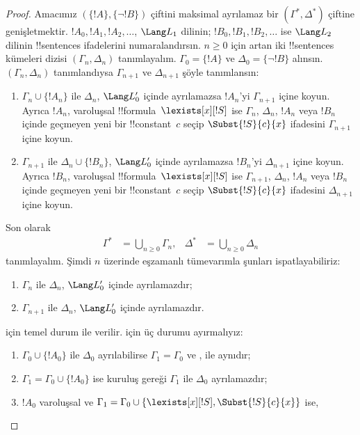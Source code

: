 \begin{proof}
Amacımız $(\{!A\},\{\lnot !B\})$ çiftini maksimal ayrılamaz bir
$(\Gamma^*,\Delta^*)$ çiftine genişletmektir. $!A_0,!A_1,!A_2,\dots$,
$\Lang L_1$ dilinin; $!B_0,!B_1,!B_2,\dots$ ise $\Lang L_2$ dilinin
!!{sentence}s ifadelerini numaralandırsın. $n\geq0$ için artan iki
!!{sentence}s kümeleri dizisi $(\Gamma_n,\Delta_n)$ tanımlayalım.
$\Gamma_0=\{!A\}$ ve $\Delta_0=\{\lnot !B\}$ alınsın.
$(\Gamma_n,\Delta_n)$ tanımlandıysa $\Gamma_{n+1}$ ve
$\Delta_{n+1}$ şöyle tanımlansın:
\begin{enumerate}
\item $\Gamma_n\cup\{!A_n\}$ ile $\Delta_n$, $\Lang L'_0$ içinde
  ayrılamazsa $!A_n$'yi $\Gamma_{n+1}$ içine koyun. Ayrıca $!A_n$,
  varoluşsal !!{formula}~$\lexists[x][!S]$ ise $\Gamma_n$,
  $\Delta_n$, $!A_n$ veya $!B_n$ içinde geçmeyen yeni bir
  !!{constant}~$c$ seçip $\Subst{!S}{c}{x}$ ifadesini
  $\Gamma_{n+1}$ içine koyun.
\item $\Gamma_{n+1}$ ile $\Delta_n\cup\{!B_n\}$, $\Lang L'_0$
  içinde ayrılamazsa $!B_n$'yi $\Delta_{n+1}$ içine koyun. Ayrıca
  $!B_n$, varoluşsal !!{formula}~$\lexists[x][!S]$ ise
  $\Gamma_{n+1}$, $\Delta_n$, $!A_n$ veya $!B_n$ içinde geçmeyen yeni
  bir !!{constant}~$c$ seçip $\Subst{!S}{c}{x}$ ifadesini
  $\Delta_{n+1}$ içine koyun.
\end{enumerate}
Son olarak
\begin{align*}
  \Gamma^* & = \bigcup_{n\ge 0} \Gamma_n, &
  \Delta^* & = \bigcup_{n\ge 0} \Delta_n
\end{align*}
tanımlayalım. Şimdi $n$ üzerinde eşzamanlı tümevarımla şunları
ispatlayabiliriz:
\begin{enumerate}
\item{} $\Gamma_n$ ile $\Delta_n$, $\Lang L'_0$ içinde
  ayrılamazdır;
\item{} $\Gamma_{n+1}$ ile $\Delta_n$, $\Lang L'_0$
  içinde ayrılamazdır.
\end{enumerate}
 için temel durum  ile verilir.
 için üç durumu ayırmalıyız:
\begin{enumerate}
\item $\Gamma_0\cup\{!A_0\}$ ile $\Delta_0$ ayrılabilirse
  $\Gamma_1=\Gamma_0$ ve ,  ile aynıdır;
\item $\Gamma_1=\Gamma_0\cup\{!A_0\}$ ise kuruluş gereği
  $\Gamma_1$ ile $\Delta_0$ ayrılamazdır;
\item $!A_0$ varoluşsal ve
  $\Gamma_1=\Gamma_0\cup\{\lexists[x][!S],\Subst{!S}{c}{x}\}$ ise,

\end{enumerate}
\end{proof}
